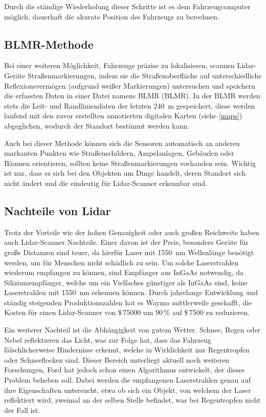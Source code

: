 Durch die ständige Wiederholung dieser Schritte ist es dem Fahrzeugcomputer möglich, dauerhaft die akurate Position des Fahrzeugs zu berechnen.

\subsection{BLMR-Methode}

Bei einer weiteren Möglichkeit, Fahrzeuge präzise zu lokalisieren, scannen \acs{Lidar}-Geräte Straßenmarkierungen, indem sie die Straßenoberfläche auf unterschiedliche Reflexionsvermögen (aufgrund weißer Markierungen) untersuchen und speichern die erfassten Daten in einer Datei namens \acs{BLMR} (\acl{BLMR}). In der \acs{BLMR} werden stets die Leit- und Randliniendaten der letzten \SI{240}{\meter} gespeichert, diese werden laufend mit den zuvor erstellten annotierten digitalen Karten (siehe \ref{maps}) abgeglichen, wodurch der Standort bestimmt werden kann. 

Auch bei dieser Methode können sich die Sensoren automatisch an anderen markanten Punkten wie Straßenschildern, Ampelanlagen, Gebäuden oder Bäumen orientieren, sollten keine Straßenmarkierungen vorhanden sein. Wichtig ist nur, dass es sich bei den Objekten um Dinge handelt, deren Standort sich nicht ändert und die eindeutig für \acs{Lidar}-Scanner erkennbar sind.

\subsection*{Nachteile von Lidar}

Trotz der Vorteile wie der hohen Genauigkeit oder auch großen Reichweite haben auch \acs{Lidar}-Scanner Nachteile. Einer davon ist der Preis, besonders Geräte für große Distanzen sind teuer, da hierfür Laser mit \SI{1550}{\nano\meter} Wellenlänge benötigt werden, um für Menschen nicht schädlich zu sein. Um solche Laserstrahlen wiederum empfangen zu können, sind Empfänger aus \ac{InGaAs} notwendig, da Siliziumempfänger, welche um ein Vielfaches günstiger als \ac{InGaAs} sind, keine Laserstrahlen mit \SI{1550}{\nano\meter} erkennen können.  Durch jahrelange Entwicklung und ständig steigenden Produktionszahlen hat es Waymo mittlerweile geschafft, die Kosten für einen \acs{Lidar}-Scanner von \$\,\num{75000} um 90\,\% auf \$\,\num{7500} zu reduzieren. 

Ein weiterer Nachteil ist die Abhängigkeit von gutem Wetter. Schnee, Regen oder Nebel reflektieren das Licht, was zur Folge hat, dass das Fahrzeug fälschlicherweise Hindernisse erkennt, welche in Wirklichkeit nur Regentropfen oder Schneeflocken sind. Dieser Bereich unterliegt aktuell noch weiteren Forschungen, Ford hat jedoch schon einen Algorithmus entwickelt, der dieses Problem beheben soll. Dabei werden die empfangenen Laserstrahlen genau auf ihre Eigenschaften untersucht, etwa ob sich ein Objekt, von welchem der Laser reflektiert wird, zweimal an der selben Stelle befindet, was bei Regentropfen nicht der Fall ist.


